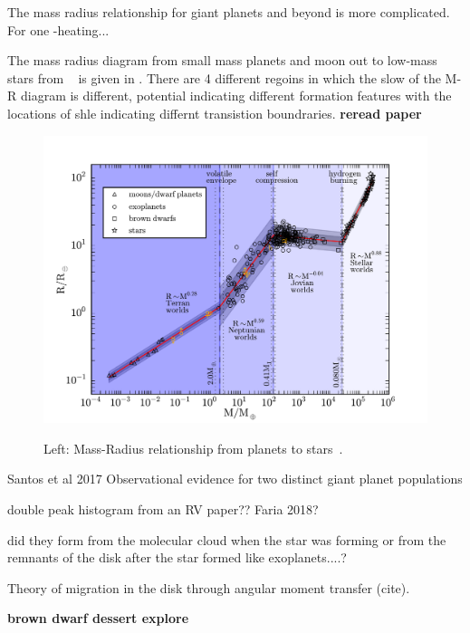 The mass radius relationship for giant planets and beyond is more complicated. For one -heating...

The mass radius diagram from small mass planets and moon out to low-mass stars from ~\citet{chen_probabilistic_2016} is given in .
There are 4 different regoins in which the slow of the M-R diagram is different, potential indicating different formation features with the locations of shle indicating differnt transistion boundraries. \textbf{reread paper} 

\begin{figure}[t]
    \centering
    \includegraphics[width=0.9\linewidth]{./figures/introduction/mass_radius_relation.pdf}  \\
    \caption{Left: Mass-Radius relationship from planets to stars~\citet{chen_probabilistic_2016}.}
    \label{fig:mass_radius_relation}
\end{figure}


\citep{santos_observational_2017} Santos et al 2017   Observational evidence for two distinct giant planet populations




double peak histogram from an {RV} paper?? Faria 2018?


did they form from the molecular cloud when the star was forming or from the remnants of the disk after the star formed like exoplanets....?


Theory of migration in the disk through  angular moment transfer (cite).





\textbf{
    brown dwarf dessert explore \citet{ranc_moa2007blg197_2015}}


